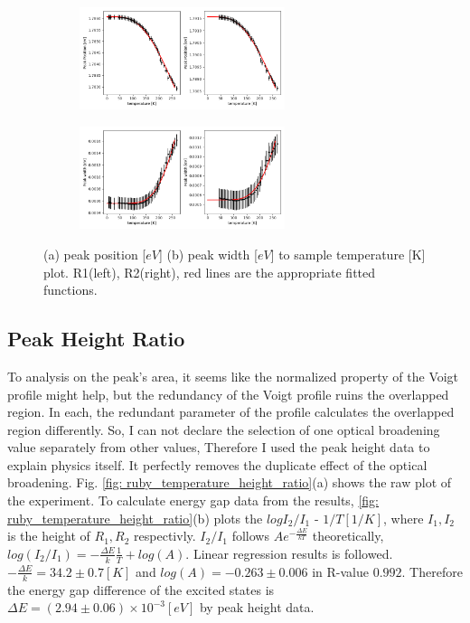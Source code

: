 \documentclass{article}
\begin{document}
\begin{figure}[ht]
  \centering
  \begin{subfigure}[b]{6cm}
      \centering
      \includegraphics[width=6cm]{../results/Ruby_temperature_peak_fig.png}
      \caption{}
  \end{subfigure}
  \hfill
  \begin{subfigure}[b]{6cm}
      \centering
      \includegraphics[width=6cm]{../results/Ruby_temperature_width_fig.png}
      \caption{}
  \end{subfigure}

  \caption{(a) peak position [$eV$] (b) peak width [$eV$] to sample temperature [K] plot. R1(left), R2(right), red lines are the appropriate fitted functions.}
  \label{fig: Ruby_temperature_results}
\end{figure}

\subsection{Peak Height Ratio}
\label{results: peak_height}

To analysis on the peak's area, it seems like the normalized property of the Voigt profile might help, but the redundancy of the Voigt profile ruins the overlapped region.
In each, the redundant parameter of the profile calculates the overlapped region differently.
So, I can not declare the selection of one optical broadening value separately from other values, Therefore I used the peak height data to explain physics itself.
It perfectly removes the duplicate effect of the optical broadening.
Fig. \ref{fig: ruby_temperature_height_ratio}(a) shows the raw plot of the experiment.
To calculate energy gap data from the results, \ref{fig: ruby_temperature_height_ratio}(b) plots the $log I_2/I_1$ - $1/T [1/K]$, where $I_1 , I_2$ is the height of $R_1, R_2$ respectivly.
$I_2/ I_1$ follows $A e^{-\frac{\Delta E}{kT}}$ theoretically, $log(I_2/I_1) = -\frac{\Delta E}{k} \frac{1}{T} + log(A)$.
Linear regression results is followed. $-\frac{\Delta E}{k} = 34.2 \pm 0.7 [K]$ and $log(A) = -0.263 \pm 0.006$ in R-value $0.992$.
Therefore the energy gap difference of the excited states is $\Delta E =(2.94 \pm 0.06) \times 10^{-3} [eV]$ by peak height data.
\end{document}
